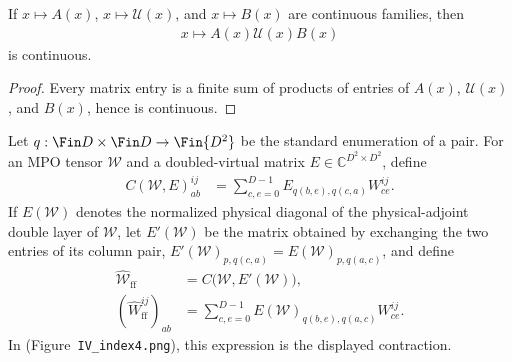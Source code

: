 \begin{lemma}
    \label{thm:mpu_virtual_sandwich_continuous}
    \leanok
    If $x\mapsto A(x)$, $x\mapsto\mathcal U(x)$, and $x\mapsto B(x)$ are
    continuous families, then
    \begin{align}
        x\longmapsto A(x)\mathcal U(x)B(x)
    \end{align}
    is continuous.
\end{lemma}

\begin{proof}\leanok
    Every matrix entry is a finite sum of products of entries of $A(x)$,
    $\mathcal U(x)$, and $B(x)$, hence is continuous.
\end{proof}

\begin{definition}
    \label{def:mpu_factor_free_sandwich}
    \leanok
    Let $q:\Fin D\times\Fin D\to\Fin{D^2}$ be the standard enumeration of a
    pair. For an MPO tensor $\mathcal W$ and a doubled-virtual matrix
    $E\in\mathbb C^{D^2\times D^2}$, define
    \begin{align}
        C(\mathcal W,E)^{ij}_{ab}
         & =\sum_{c,e=0}^{D-1}E_{q(b,e),q(c,a)}W^{ij}_{ce}.
        \label{eq:mpu_factor_free_contraction}
    \end{align}
    If $E(\mathcal W)$ denotes the normalized physical diagonal of the
    physical-adjoint double layer of $\mathcal W$, let $E'(\mathcal W)$ be
    the matrix obtained by exchanging the two entries of its column pair,
    $E'(\mathcal W)_{p,q(c,a)}=E(\mathcal W)_{p,q(a,c)}$, and define
    \begin{align}
        \widehat{\mathcal W}_{\mathrm{ff}}
         & =C\bigl(\mathcal W,E'(\mathcal W)\bigr),
        \label{eq:mpu_factor_free_sandwich}
        \\
        (\widehat W_{\mathrm{ff}}^{ij})_{ab}
         & =\sum_{c,e=0}^{D-1}E(\mathcal W)_{q(b,e),q(a,c)}W^{ij}_{ce}.
    \end{align}
    In \cite[Proposition~IV.5]{Cirac2017MPU} (Figure~\texttt{IV\_index4.png}), this expression is the displayed
    contraction.
\end{definition}

